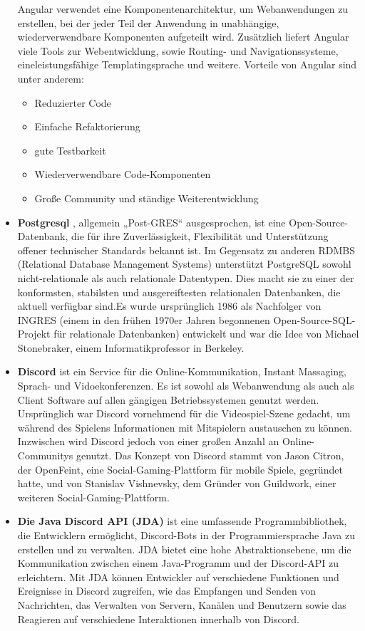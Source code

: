 \begin{itemize}
 Angular verwendet eine Komponentenarchitektur, um Webanwendungen zu erstellen, bei der jeder Teil der Anwendung in unabhängige, wiederverwendbare Komponenten aufgeteilt wird. Zusätzlich liefert Angular viele Tools zur Webentwicklung, sowie Routing- und Navigationssysteme, eineleistungsfähige Templatingsprache und weitere. Vorteile von Angular sind unter anderem:
 \begin{itemize}
     \item Reduzierter Code
     \item Einfache Refaktorierung
     \item gute Testbarkeit
     \item Wiederverwendbare Code-Komponenten
     \item Große Community und ständige Weiterentwicklung
 \end{itemize}
 \item \textbf{Postgresql} , allgemein „Post-GRES“ ausgesprochen, ist eine Open-Source-Datenbank, die für ihre Zuverlässigkeit, Flexibilität und Unterstützung offener technischer Standards bekannt ist. Im Gegensatz zu anderen RDMBS (Relational Database Management Systems) unterstützt PostgreSQL sowohl nicht-relationale als auch relationale Datentypen. Dies macht sie zu einer der konformsten, stabilsten und ausgereiftesten relationalen Datenbanken, die aktuell verfügbar sind.Es wurde ursprünglich 1986 als Nachfolger von INGRES (einem in den frühen 1970er Jahren begonnenen Open-Source-SQL-Projekt für relationale Datenbanken) entwickelt und war die Idee von Michael Stonebraker, einem Informatikprofessor in Berkeley.
 \item \textbf{Discord} ist ein Service für die Online-Kommunikation, Instant Massaging, Sprach- und Vidoekonferenzen. Es ist sowohl als Webanwendung als auch als Client Software auf allen gängigen Betriebssystemen genutzt werden. Ursprünglich war Discord vornehmend für die Videospiel-Szene gedacht, um während des Spielens Informationen mit Mitspielern austauschen zu können. Inzwischen wird Discord jedoch von einer großen Anzahl an Online-Communitys genutzt. Das Konzept von Discord stammt von Jason Citron, der OpenFeint, eine Social-Gaming-Plattform für mobile Spiele, gegründet hatte, und von Stanislav Vishnevsky, dem Gründer von Guildwork, einer weiteren Social-Gaming-Plattform.
 \item \textbf{Die Java Discord API (JDA)} ist eine umfassende Programmbibliothek, die Entwicklern ermöglicht, Discord-Bots in der Programmiersprache Java zu erstellen und zu verwalten. JDA bietet eine hohe Abstraktionsebene, um die Kommunikation zwischen einem Java-Programm und der Discord-API zu erleichtern. Mit JDA können Entwickler auf verschiedene Funktionen und Ereignisse in Discord zugreifen, wie das Empfangen und Senden von Nachrichten, das Verwalten von Servern, Kanälen und Benutzern sowie das Reagieren auf verschiedene Interaktionen innerhalb von Discord.
        

\end{itemize}

